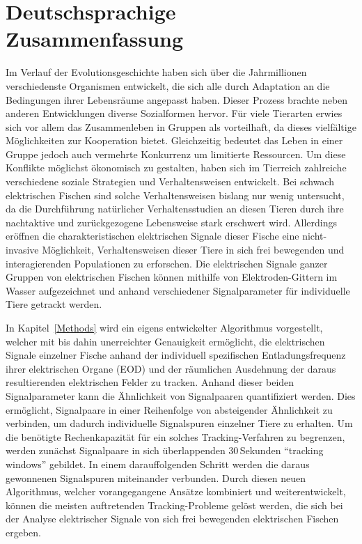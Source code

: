 \documentclass[11pt,pdftex,]{book}
\begin{document}
\makeatletter
\@openrightfalse
\makeatother
\chapter*{Deutschsprachige Zusammenfassung}


Im Verlauf der Evolutionsgeschichte haben sich über die Jahrmillionen verschiedenste Organismen entwickelt, die sich alle durch Adaptation an die Bedingungen ihrer Lebensräume angepasst haben. Dieser Prozess brachte neben anderen Entwicklungen diverse Sozialformen hervor. Für viele Tierarten erwies sich vor allem das Zusammenleben in Gruppen als vorteilhaft, da dieses vielfältige Möglichkeiten zur Kooperation bietet. Gleichzeitig bedeutet das Leben in einer Gruppe jedoch auch vermehrte Konkurrenz um limitierte Ressourcen. Um diese Konflikte möglichst ökonomisch zu gestalten, haben sich im Tierreich zahlreiche verschiedene soziale Strategien und Verhaltensweisen entwickelt. Bei schwach elektrischen Fischen sind solche Verhaltensweisen bislang nur wenig untersucht, da die Durchführung natürlicher Verhaltensstudien an diesen Tieren durch ihre nachtaktive und zurückgezogene Lebensweise stark erschwert wird. Allerdings eröffnen die charakteristischen elektrischen Signale dieser Fische eine nicht-invasive Möglichkeit, Verhaltensweisen dieser Tiere in sich frei bewegenden und interagierenden Populationen zu erforschen. Die elektrischen Signale ganzer Gruppen von elektrischen Fischen können mithilfe von Elektroden-Gittern im Wasser aufgezeichnet und anhand verschiedener Signalparameter für individuelle Tiere getrackt werden.

In Kapitel~\ref{Methods} wird ein eigens entwickelter Algorithmus vorgestellt, welcher mit bis dahin unerreichter Genauigkeit ermöglicht, die elektrischen Signale einzelner Fische anhand der individuell spezifischen Entladungsfrequenz ihrer elektrischen Organe (EOD) und der räumlichen Ausdehnung der daraus resultierenden elektrischen Felder zu tracken. Anhand dieser beiden Signalparameter kann die Ähnlichkeit von Signalpaaren quantifiziert werden. Dies ermöglicht, Signalpaare in einer Reihenfolge von absteigender Ähnlichkeit zu verbinden, um dadurch individuelle Signalspuren einzelner Tiere zu erhalten. Um die benötigte Rechenkapazität für ein solches Tracking-Verfahren zu begrenzen, werden zunächst Signalpaare in sich überlappenden 30\,Sekunden ``tracking windows'' gebildet. In einem darauffolgenden Schritt werden die daraus gewonnenen Signalspuren miteinander verbunden. Durch diesen neuen Algorithmus, welcher vorangegangene Ansätze kombiniert und weiterentwickelt, können die meisten auftretenden Tracking-Probleme gelöst werden, die sich bei der Analyse elektrischer Signale von sich frei bewegenden elektrischen Fischen ergeben. 
\end{document}
